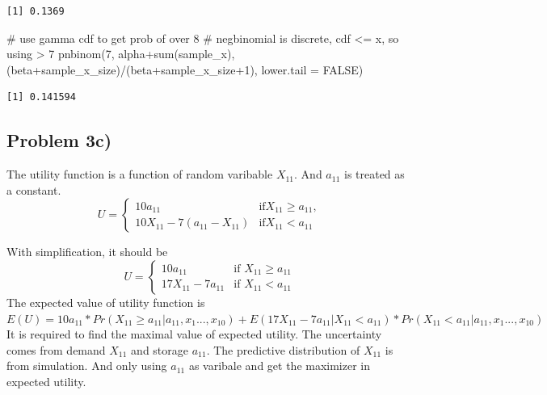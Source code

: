 \documentclass[
  letterpaper,
  DIV=11,
  numbers=noendperiod]{scrartcl}
\newenvironment{Shaded}{\begin{snugshade}}{\end{snugshade}}
\newcommand{\AttributeTok}[1]{\textcolor[rgb]{0.40,0.45,0.13}{#1}}
\newcommand{\CommentTok}[1]{\textcolor[rgb]{0.37,0.37,0.37}{#1}}
\newcommand{\ConstantTok}[1]{\textcolor[rgb]{0.56,0.35,0.01}{#1}}
\newcommand{\DecValTok}[1]{\textcolor[rgb]{0.68,0.00,0.00}{#1}}
\newcommand{\FunctionTok}[1]{\textcolor[rgb]{0.28,0.35,0.67}{#1}}
\newcommand{\NormalTok}[1]{\textcolor[rgb]{0.00,0.23,0.31}{#1}}
\newcommand{\SpecialCharTok}[1]{\textcolor[rgb]{0.37,0.37,0.37}{#1}}
\begin{document}
\begin{verbatim}
[1] 0.1369
\end{verbatim}

\begin{Shaded}
\begin{Highlighting}[]
\CommentTok{\# use gamma cdf to get prob of over 8}
\CommentTok{\# negbinomial is discrete, cdf \textless{}= x, so using \textgreater{} 7}
\FunctionTok{pnbinom}\NormalTok{(}\DecValTok{7}\NormalTok{, alpha}\SpecialCharTok{+}\FunctionTok{sum}\NormalTok{(sample\_x), (beta}\SpecialCharTok{+}\NormalTok{sample\_x\_size)}\SpecialCharTok{/}\NormalTok{(beta}\SpecialCharTok{+}\NormalTok{sample\_x\_size}\SpecialCharTok{+}\DecValTok{1}\NormalTok{), }\AttributeTok{lower.tail =} \ConstantTok{FALSE}\NormalTok{)}
\end{Highlighting}
\end{Shaded}

\begin{verbatim}
[1] 0.141594
\end{verbatim}

\subsection{Problem 3c)}\label{problem-3c}

The utility function is a function of random varibable \(X_{11}\). And
\(a_{11}\) is treated as a constant. \begin{equation} 
U = \begin{cases}
10a_{11} & \text{if} X_{11} \geq a_{11}, \\
10X_{11} - 7(a_{11}-X_{11}) & \text{if} X_{11} < a_{11}
\end{cases}
\end{equation}

With simplification, it should be \begin{equation} 
U = \begin{cases}
10a_{11} & \text{if } X_{11} \geq a_{11}\\
17X_{11} - 7a_{11} & \text{if } X_{11} < a_{11}
\end{cases}
\end{equation} The expected value of utility function is
\(E(U)=10a_{11}*Pr(X_{11} \geq a_{11}|a_{11},x_{1}...,x_{10}) +E(17X_{11}-7a_{11}|X_{11}<a_{11})*Pr(X_{11} < a_{11}|a_{11},x_{1}...,x_{10})\)
It is required to find the maximal value of expected utility. The
uncertainty comes from demand \(X_{11}\) and storage \(a_{11}\). The
predictive distribution of \(X_{11}\) is from simulation. And only using
\(a_{11}\) as varibale and get the maximizer in expected utility.
\end{document}
